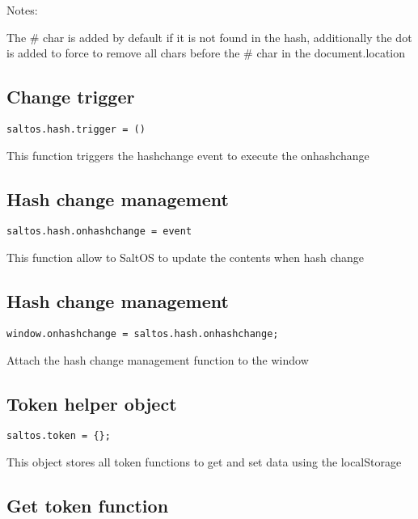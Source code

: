 \documentclass[a4paper]{book}
\begin{document}
Notes:

The \# char is added by default if it is not found in the hash, additionally the dot is
added to force to remove all chars before the \# char in the document.location

\hypertarget{toc402}{}
\subsection{Change trigger}

\begin{lstlisting}
saltos.hash.trigger = ()
\end{lstlisting}

This function triggers the hashchange event to execute the onhashchange

\hypertarget{toc403}{}
\subsection{Hash change management}

\begin{lstlisting}
saltos.hash.onhashchange = event
\end{lstlisting}

This function allow to SaltOS to update the contents when hash change

\hypertarget{toc404}{}
\subsection{Hash change management}

\begin{lstlisting}
window.onhashchange = saltos.hash.onhashchange;
\end{lstlisting}

Attach the hash change management function to the window

\hypertarget{toc405}{}
\subsection{Token helper object}

\begin{lstlisting}
saltos.token = {};
\end{lstlisting}

This object stores all token functions to get and set data using the localStorage

\hypertarget{toc406}{}
\subsection{Get token function}
\end{document}
